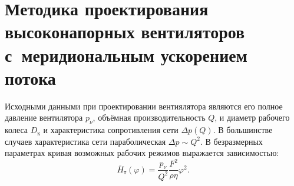 \section{Методика проектирования высоконапорных вентиляторов с~меридиональным ускорением потока}\label{sec:designMethodology}

Исходными данными при проектировании вентиялятора являются его полное давление вентилятора \(p_\nu\), объёмная производительность \(Q\), и диаметр рабочего колеса \(D_\text{к}\) и характеристика сопротивления сети \(\Delta p(Q)\).
В большинстве случаев характеристика сети параболическая \(\Delta p \sim Q^2\).
В безразмерных параметрах кривая возможных рабочих режимов выражается зависимостью:
\begin{equation}
    \bar{H}_\text{т}(\varphi)=\frac{p_\nu}{Q^2} \frac{F^2}{\rho \eta} \varphi^2.
\end{equation}

